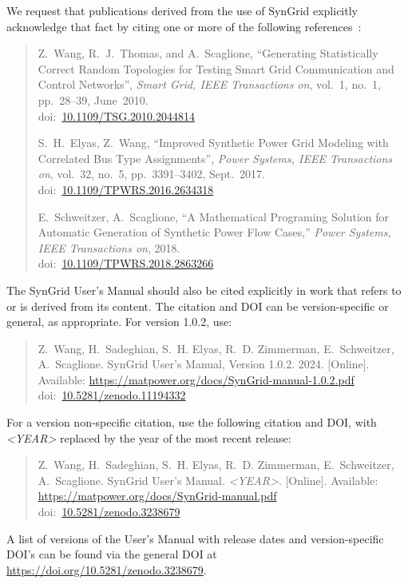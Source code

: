 \documentclass[12pt]{article}
\newcommand{\syngrid}[0]{{SynGrid}}
\newcommand{\doi}[1]{doi:~\href{https://doi.org/#1}{#1}}
\numberwithin{equation}{section}
\numberwithin{table}{section}
\numberwithin{figure}{section}
\begin{document}
We request that publications derived from the use of \syngrid{} explicitly
acknowledge that fact by citing one or more of the following
references~\cite{syngrid_nestedSW, syngrid_bustype, schweitzer2018mathematical}:

\begin{quote}
\footnotesize
Z.~Wang, R.~J.~Thomas, and A.~Scaglione, ``Generating Statistically Correct Random Topologies for Testing Smart Grid Communication and Control Networks'', \emph{Smart Grid, IEEE Transactions on}, vol.~1, no.~1, pp.~28--39, June~2010. \\
\doi{10.1109/TSG.2010.2044814}

S.~H.~Elyas, Z.~Wang, ``Improved Synthetic Power Grid Modeling with Correlated Bus Type Assignments'', \emph{Power Systems, IEEE Transactions on}, vol.~32, no.~5, pp.~3391--3402, Sept.~2017. \\
\doi{10.1109/TPWRS.2016.2634318}

E.~Schweitzer, A.~Scaglione, ``A Mathematical Programing Solution for Automatic Generation of Synthetic Power Flow Cases,''  \emph{Power Systems, IEEE Transactions on}, 2018. \\
\doi{10.1109/TPWRS.2018.2863266}
\end{quote}

The \syngrid{} User's Manual should also be cited explicitly in work that
refers to or is derived from its content. The citation and DOI can be
version-specific or general, as appropriate. For version 1.0.2, use:

\begin{quote}
\footnotesize
Z.~Wang, H.~Sadeghian, S.~H. Elyas, R.~D. Zimmerman, E.~Schweitzer,
A.~Scaglione. \syngrid{} User's Manual, Version 1.0.2. 2024. [Online]. Available: \url{https://matpower.org/docs/SynGrid-manual-1.0.2.pdf}\\
\doi{10.5281/zenodo.11194332}
\end{quote}
For a version non-specific citation, use the following citation and DOI,
with \emph{\textless{}YEAR\textgreater{}} replaced by the year of the most recent release:

\begin{quote}
\footnotesize
Z.~Wang, H.~Sadeghian, S.~H. Elyas, R.~D. Zimmerman, E.~Schweitzer,
A.~Scaglione. \syngrid{} User's Manual. \emph{\textless{}YEAR\textgreater{}}.
[Online]. Available: \url{https://matpower.org/docs/SynGrid-manual.pdf}\\
\doi{10.5281/zenodo.3238679}
\end{quote}
A list of versions of the User's Manual with release dates and
version-specific DOI's can be found via the general DOI at
\url{https://doi.org/10.5281/zenodo.3238679}.
\end{document}
